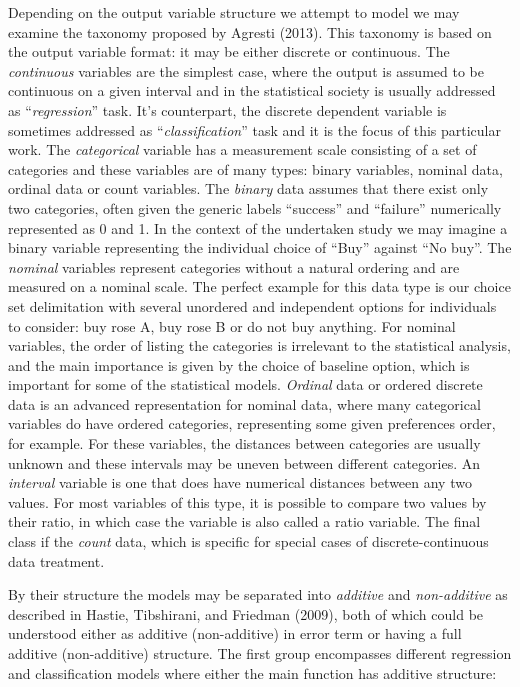 \documentclass[12pt,]{article}
\begin{document}
Depending on the output variable structure we attempt to model we may
examine the taxonomy proposed by Agresti (2013). This taxonomy is based
on the output variable format: it may be either discrete or continuous.
The \emph{continuous} variables are the simplest case, where the output
is assumed to be continuous on a given interval and in the statistical
society is usually addressed as ``\emph{regression}'' task. It's
counterpart, the discrete dependent variable is sometimes addressed as
``\emph{classification}'' task and it is the focus of this particular
work. The \emph{categorical} variable has a measurement scale consisting
of a set of categories and these variables are of many types: binary
variables, nominal data, ordinal data or count variables. The
\emph{binary} data assumes that there exist only two categories, often
given the generic labels ``success'' and ``failure'' numerically
represented as 0 and 1. In the context of the undertaken study we may
imagine a binary variable representing the individual choice of ``Buy''
against ``No buy''. The \emph{nominal} variables represent categories
without a natural ordering and are measured on a nominal scale. The
perfect example for this data type is our choice set delimitation with
several unordered and independent options for individuals to consider:
buy rose A, buy rose B or do not buy anything. For nominal variables,
the order of listing the categories is irrelevant to the statistical
analysis, and the main importance is given by the choice of baseline
option, which is important for some of the statistical models.
\emph{Ordinal} data or ordered discrete data is an advanced
representation for nominal data, where many categorical variables do
have ordered categories, representing some given preferences order, for
example. For these variables, the distances between categories are
usually unknown and these intervals may be uneven between different
categories. An \emph{interval} variable is one that does have numerical
distances between any two values. For most variables of this type, it is
possible to compare two values by their ratio, in which case the
variable is also called a ratio variable. The final class if the
\emph{count} data, which is specific for special cases of
discrete-continuous data treatment.

By their structure the models may be separated into \emph{additive} and
\emph{non-additive} as described in Hastie, Tibshirani, and Friedman
(2009), both of which could be understood either as additive
(non-additive) in error term or having a full additive (non-additive)
structure. The first group encompasses different regression and
classification models where either the main function has additive
structure:
\end{document}
